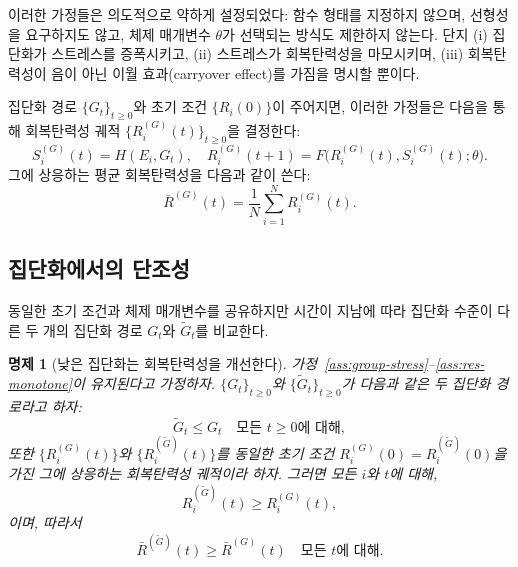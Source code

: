 \documentclass[11pt]{article}
\theoremstyle{plain}
\newtheorem{proposition}{명제}
\begin{document}
이러한 가정들은 의도적으로 약하게 설정되었다: 함수 형태를 지정하지 않으며, 선형성을 요구하지도 않고, 체제 매개변수 $\theta$가 선택되는 방식도 제한하지 않는다.
단지 (i) 집단화가 스트레스를 증폭시키고, (ii) 스트레스가 회복탄력성을 마모시키며, (iii) 회복탄력성이 음이 아닌 이월 효과(carryover effect)를 가짐을 명시할 뿐이다.

집단화 경로 $\{G_t\}_{t\ge 0}$와 초기 조건 $\{R_i(0)\}$이 주어지면, 이러한 가정들은 다음을 통해 회복탄력성 궤적 $\{R_i^{(G)}(t)\}_{t\ge 0}$을 결정한다:
\[
S_i^{(G)}(t) = H(E_i, G_t), \quad
R_i^{(G)}(t+1) = F\bigl(R_i^{(G)}(t), S_i^{(G)}(t); \theta\bigr).
\]
그에 상응하는 평균 회복탄력성을 다음과 같이 쓴다:
\[
\bar{R}^{(G)}(t) = \frac{1}{N}\sum_{i=1}^N R_i^{(G)}(t).
\]

\subsection{집단화에서의 단조성}

동일한 초기 조건과 체제 매개변수를 공유하지만 시간이 지남에 따라 집단화 수준이 다른 두 개의 집단화 경로 $G_t$와 $\tilde{G}_t$를 비교한다.

\begin{proposition}[낮은 집단화는 회복탄력성을 개선한다]
\label{prop:grouping}
가정~\ref{ass:group-stress}--\ref{ass:res-monotone}이 유지된다고 가정하자.
$\{G_t\}_{t\ge 0}$와 $\{\tilde{G}_t\}_{t\ge 0}$가 다음과 같은 두 집단화 경로라고 하자:
\[
\tilde{G}_t \le G_t \quad \text{모든 } t \ge 0 \text{에 대해},
\]
또한 $\{R_i^{(G)}(t)\}$와 $\{R_i^{(\tilde{G})}(t)\}$를 동일한 초기 조건 $R_i^{(G)}(0)=R_i^{(\tilde{G})}(0)$을 가진 그에 상응하는 회복탄력성 궤적이라 하자.
그러면 모든 $i$와 $t$에 대해,
\[
R_i^{(\tilde{G})}(t) \ge R_i^{(G)}(t),
\]
이며, 따라서
\[
\bar{R}^{(\tilde{G})}(t) \ge \bar{R}^{(G)}(t) \quad \text{모든 } t \text{에 대해}.
\]
\end{proposition}
\end{document}
